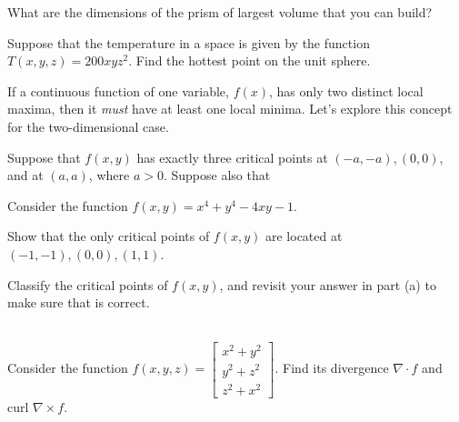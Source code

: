 What are the dimensions of the prism of largest volume that you can build?

\item
{}

Suppose that the temperature in a space is given by the function
$T(x,y,z) = 200xyz^2$.  Find the hottest point on the unit sphere.

\item
If a continuous function of one variable, $f(x)$, has only two distinct local maxima, then it \textit{must} have at least one local minima. Let's explore this concept for the two-dimensional case. 
\BEN
\item Suppose that $f(x,y)$ has exactly three critical points at $(-a,-a),(0,0)$, and at $(a,a)$, where $a>0$. Suppose also that 
\item Consider the function $f(x,y)=x^4+y^4-4xy-1$. 
\BEN
\item Show that the only critical points of $f(x,y)$ are located at $(-1,-1),(0,0),(1,1)$. 
\item Classify the critical points of $f(x,y)$, and revisit your answer in part (a) to make sure that is correct. 
\EEN
\EEN
\item
{}\\
Consider the function $f(x,y,z) = \begin{bmatrix}
                                   x^2 + y^2 \\
                                   y^2 + z^2 \\
                                   z^2 + x^2
                                  \end{bmatrix}$.
Find its divergence $\nabla \cdot f$ and curl $\nabla \times f$.


\EEN
